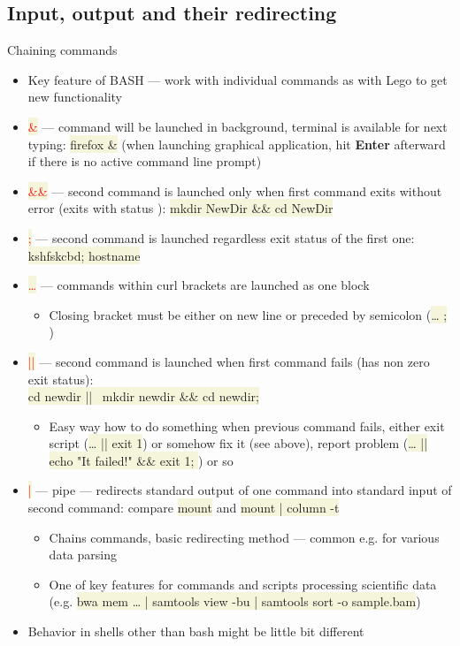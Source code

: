 \documentclass[compress, ucs, xelatex, 11pt, xcolor=svgnames, aspectratio=169,
	hyperref={
		bookmarks=true,
		unicode=true,
		colorlinks=true,
		pdftitle={Linux, command line and MetaCentrum},
		plainpages=false,
		pdfauthor={Vojtech Zeisek},
		pdfsubject={Course about use of Linux command line, writing shell scripts and using MetaCentrum of CESNET},
		pdfcreator={XeLaTeX},
		pdfkeywords={Linux, GNU, BASH, shell, command line, MetaCentrum},
		linkcolor=DarkRed, %
		anchorcolor=DarkBlue, %
		citecolor=Indigo, %
		filecolor=NavyBlue, %
		menucolor=DarkMagenta, %
		urlcolor=DarkBlue, %
		pdftex},
	url={hyphens, lowtilde} %
	]{beamer}
\renewcommand{\texttt}[1]{\colorbox{Beige}{{\ttfamily #1}}}
\renewcommand{\alert}[1]{\textcolor{red}{#1}}
\begin{document}
\subsection[Chaining]{Input, output and their redirecting}

\begin{frame}[allowframebreaks]{Chaining commands}
	\begin{itemize}
		\item Key feature of BASH --- work with individual commands as with Lego to get new functionality
		\item \alert{\texttt{\&}} --- command will be launched in background, terminal is available for next typing: \texttt{firefox \&} (when launching graphical application, hit \textbf{Enter} afterward if there is no active command line prompt)
		\item \alert{\texttt{\&\&}} --- second command is launched only when first command exits without error (exits with status \texttt{0}): \texttt{mkdir NewDir \&\& cd NewDir}
		\item \alert{\texttt{;}} --- second command is launched regardless exit status of the first one: \texttt{kshfskcbd; hostname}
		\item \alert{\texttt{\textbraceleft\ldots\textbraceright}} --- commands within curl brackets are launched as one block
		\begin{itemize}
			\item Closing bracket \texttt{\textbraceright} must be either on new line or preceded by semicolon (\texttt{\ldots{ }; \textbraceright})
		\end{itemize}
		\item \alert{\texttt{||}} --- second command is launched when first command fails (has non zero exit status):\\\texttt{cd newdir || \textbraceleft~mkdir newdir \&\& cd newdir; \textbraceright}
		\begin{itemize}
			\item Easy way how to do something when previous command fails, either exit script (\texttt{\ldots{ }|| exit 1}) or somehow fix it (see above), report problem (\texttt{\ldots{ }|| \textbraceleft echo "It failed!" \&\& exit 1; \textbraceright}) or so
		\end{itemize}
		\item \alert{\texttt{|}} --- pipe --- redirects standard output of one command into standard input of second command: compare \texttt{mount} and \texttt{mount | column -t}
		\begin{itemize}
			\item Chains commands, basic redirecting method --- common e.g. for various data parsing
			\item One of key features for commands and scripts processing scientific data (e.g. \texttt{bwa mem \ldots{ }| samtools view -bu | samtools sort -o sample.bam})
		\end{itemize}
		\item Behavior in shells other than bash might be little bit different
	\end{itemize}
\end{frame}
\end{document}
